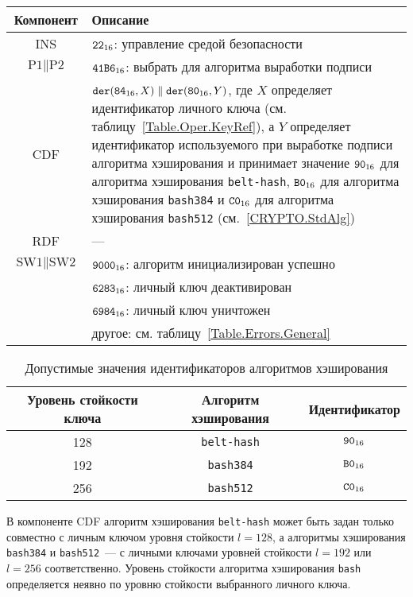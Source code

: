 \begin{table}[hbt]
\caption{}\label{Table.Oper.SetDSTCmd}
\begin{tabular}{|c|p{14cm}|}
\hline
Компонент & Описание \\
\hline
\hline
INS & $\texttt{22}_{16}$: управление средой безопасности\\ 
\hline
$\text{P1} \parallel\text{P2}$ & $\texttt{41B6}_{16}$: 
выбрать для алгоритма выработки подписи \\
\hline
CDF & 
$\texttt{der}(\texttt{84}_{16}, X) \parallel \texttt{der}(\texttt{80}_{16}, Y)$, 
где $X$ определяет идентификатор личного ключа (см. таблицу~\ref{Table.Oper.KeyRef}), 
а $Y$ определяет идентификатор используемого при выработке
подписи алгоритма хэширования 
и принимает значение $\texttt{90}_{16}$ для алгоритма хэширования \texttt{belt-hash},  
$\texttt{B0}_{16}$ для алгоритма хэширования \texttt{bash384} и 
$\texttt{C0}_{16}$ для алгоритма хэширования \texttt{bash512} (см.~\ref{CRYPTO.StdAlg})\\
\hline 
RDF &  --- \\
\hline
$\text{SW1} \parallel \text{SW2}$ & 
$\texttt{9000}_{16}$: алгоритм инициализирован успешно \\
  & $\texttt{6283}_{16}$: личный ключ деактивирован \\
  & $\texttt{6984}_{16}$: личный ключ уничтожен \\
  & другое: см. таблицу~\ref{Table.Errors.General} \\
\hline
\end{tabular}
\end{table}


\begin{table}[hbt]
\caption{Допустимые значения идентификаторов алгоритмов хэширования}
\label{Table.Oper.AlgRef}
\begin{tabular}{|c|c|c|}
\hline
Уровень стойкости ключа & Алгоритм хэширования  & Идентификатор  \\
\hline
\hline
128 & \texttt{belt-hash} & $\texttt{90}_{16}$ \\
192 & \texttt{bash384} & $\texttt{B0}_{16}$ \\
256 & \texttt{bash512} & $\texttt{C0}_{16}$ \\
\hline
\end{tabular}
\end{table}

\fi


В компоненте CDF алгоритм хэширования \texttt{belt-hash}
может быть задан только совместно с личным ключом 
уровня стойкости $l=128$,
а алгоритмы хэширования \texttt{bash384} и \texttt{bash512}~--- 
с личными ключами уровней стойкости $l=192$ или $l=256$
соответственно.
Уровень стойкости алгоритма хэширования \texttt{bash} определяется 
неявно по уровню стойкости выбранного личного ключа.

